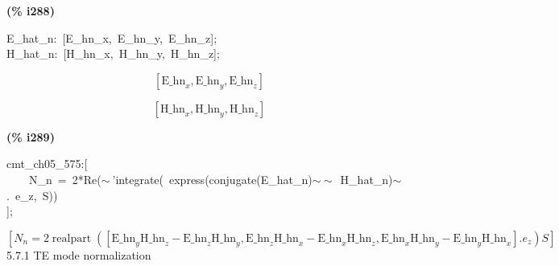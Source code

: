 \documentclass[fleqn]{article}
\begin{document}
\noindent
\begin{minipage}[t]{4.000000em}\color{red}\bfseries
(\% i288)	
\end{minipage}
\begin{minipage}[t]{\textwidth}\color{blue}
E\_hat\_n:\ [E\_hn\_x,\ E\_hn\_y,\ E\_hn\_z];\\
H\_hat\_n:\ [H\_hn\_x,\ H\_hn\_y,\ H\_hn\_z];
\end{minipage}
\[\displaystyle \tag{\% o287} 
\left[ {{\ensuremath{\mathrm{E\_ hn}}}_x}\operatorname{,}{{\ensuremath{\mathrm{E\_ hn}}}_y}\operatorname{,}{{\ensuremath{\mathrm{E\_ hn}}}_z}\right] \mbox{}\]

\[\tag{\% o288} 
\left[ {{\ensuremath{\mathrm{H\_ hn}}}_x}\operatorname{,}{{\ensuremath{\mathrm{H\_ hn}}}_y}\operatorname{,}{{\ensuremath{\mathrm{H\_ hn}}}_z}\right] \mbox{}
\]


\noindent
\begin{minipage}[t]{4.000000em}\color{red}\bfseries
(\% i289)	
\end{minipage}
\begin{minipage}[t]{\textwidth}\color{blue}
cmt\_ch05\_575:[\\
\ \ \ \ N\_n\ =\ 2*Re(\ensuremath{\sim\ }'integrate(\ express(conjugate(E\_hat\_n)\ensuremath{\sim\ }\ensuremath{\sim\ }\ H\_hat\_n)\ensuremath{\sim\ }.\ e\_z,\ S))\ \\
];
\end{minipage}
\[\displaystyle \tag{\% o289} 
\operatorname{[}{N_n}=2 \operatorname{realpart}\operatorname{(}\left[ {{\ensuremath{\mathrm{E\_ hn}}}_y} {{\ensuremath{\mathrm{H\_ hn}}}_z}-{{\ensuremath{\mathrm{E\_ hn}}}_z} {{\ensuremath{\mathrm{H\_ hn}}}_y}\operatorname{,}{{\ensuremath{\mathrm{E\_ hn}}}_z} {{\ensuremath{\mathrm{H\_ hn}}}_x}-{{\ensuremath{\mathrm{E\_ hn}}}_x} {{\ensuremath{\mathrm{H\_ hn}}}_z}\operatorname{,}{{\ensuremath{\mathrm{E\_ hn}}}_x} {{\ensuremath{\mathrm{H\_ hn}}}_y}-{{\ensuremath{\mathrm{E\_ hn}}}_y} {{\ensuremath{\mathrm{H\_ hn}}}_x}\right] \ensuremath{\mathrm{ . }}{e_z}\operatorname{)} S\operatorname{]}\mbox{}
\]
5.7.1   TE mode normalization
\end{document}

